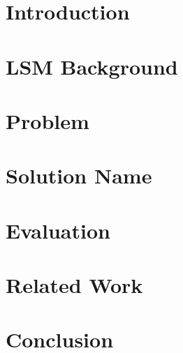 \documentclass[sigconf]{acmart}
\begin{document}
\section{Introduction}
\label{sec:intro}


\section{LSM Background}
\label{sec:background}
 


\section{Problem}
\label{sec:design_space}

 
\section{Solution Name}
\label{sec:solution}


% 

\section{Evaluation}
\label{sec:experimental_results}


\section{Related Work}
\label{sec:related_work}

 
\section{Conclusion}
\label{sec:conclusion}



\balance 
{
 
} 
\end{document}
